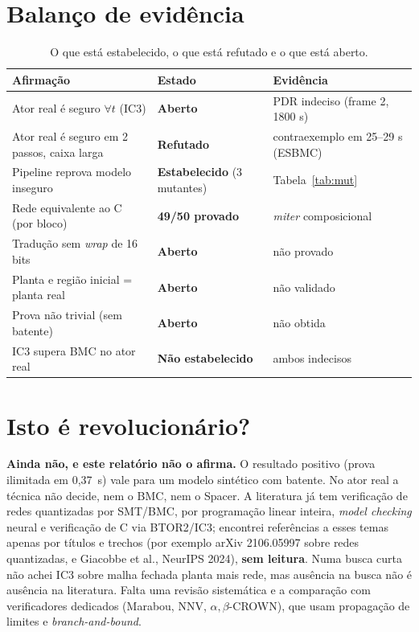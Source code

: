 \documentclass[12pt,openright,oneside,a4paper,chapter=TITLE,sumario=tradicional,english,brazil]{abntex2}
\begin{document}
\section{Balanço de evidência}

\begin{table}[htb]
\caption{O que está estabelecido, o que está refutado e o que está aberto.}\label{tab:balanco}
\centering
\begin{tabular}{p{6.0cm}|p{2.7cm}|p{4.2cm}}
\toprule
\textbf{Afirmação} & \textbf{Estado} & \textbf{Evidência} \\
\midrule
Ator real é seguro $\forall t$ (IC3) & \textbf{Aberto} & PDR indeciso (frame 2, 1800 s) \\
Ator real é seguro em 2 passos, caixa larga & \textbf{Refutado} & contraexemplo em 25--29 s (ESBMC) \\
Pipeline reprova modelo inseguro & \textbf{Estabelecido} (3 mutantes) & Tabela~\ref{tab:mut} \\
Rede equivalente ao C (por bloco) & \textbf{49/50 provado} & \emph{miter} composicional \\
Tradução sem \emph{wrap} de 16 bits & \textbf{Aberto} & não provado \\
Planta e região inicial = planta real & \textbf{Aberto} & não validado \\
Prova não trivial (sem batente) & \textbf{Aberto} & não obtida \\
IC3 supera BMC no ator real & \textbf{Não estabelecido} & ambos indecisos \\
\bottomrule
\end{tabular}
\end{table}

\section{Isto é revolucionário?}

\textbf{Ainda não, e este relatório não o afirma.} O resultado positivo (prova ilimitada em 0,37~s) vale para um modelo sintético com batente. No ator real a técnica não decide, nem o BMC, nem o Spacer. A literatura já tem verificação de redes quantizadas por SMT/BMC, por programação linear inteira, \emph{model checking} neural e verificação de C via BTOR2/IC3; encontrei referências a esses temas apenas por títulos e trechos (por exemplo arXiv 2106.05997 sobre redes quantizadas, e Giacobbe et al., NeurIPS 2024), \textbf{sem leitura}. Numa busca curta não achei IC3 sobre malha fechada planta mais rede, mas ausência na busca não é ausência na literatura. Falta uma revisão sistemática e a comparação com verificadores dedicados (Marabou, NNV, $\alpha,\beta$-CROWN), que usam propagação de limites e \emph{branch-and-bound}.
\end{document}
